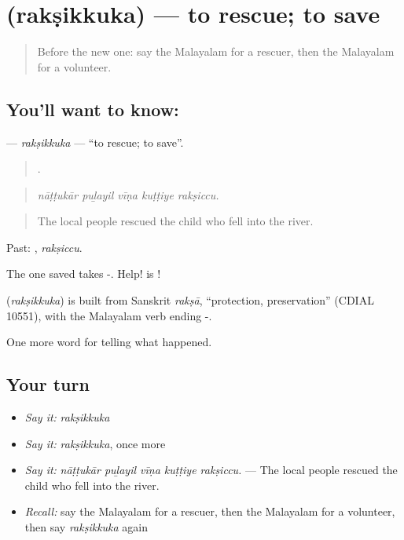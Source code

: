 \section[\texorpdfstring{\ml{രക്ഷിക്കുക} (rakṣikkuka)}{രക്ഷിക്കുക (rakṣikkuka)}]{ (rakṣikkuka) — to rescue; to save}

\label{lesson:ML-C375-raksikkuka}



\begin{quote}
Before the new one: say the Malayalam for a rescuer, then the Malayalam for a volunteer.
\end{quote}

\subsection*{You'll want to know: }
\textbf{} — \emph{rakṣikkuka} — \textquotedblleft{}to rescue; to save\textquotedblright{}.

\begin{quote}
    .
\end{quote}

\begin{quote}
\emph{nāṭṭukār puḻayil vīṇa kuṭṭiye rakṣiccu.}
\end{quote}

\begin{quote}
The local people rescued the child who fell into the river.
\end{quote}

Past: , \emph{rakṣiccu}.

The one saved takes -. Help! is !

\begin{cousinweb}
\textbf{} (\emph{rakṣikkuka}) is built from Sanskrit \emph{rakṣā}, \textquotedblleft{}protection, preservation\textquotedblright{} (CDIAL 10551), with the Malayalam verb ending -.
\end{cousinweb}

\begin{grammarlens}[title={What you've built}]
One more word for telling what happened.
\end{grammarlens}

\subsection*{Your turn}
\begin{itemize}
\raggedright
  \item \emph{Say it:} \emph{rakṣikkuka}
  \item \emph{Say it:} \emph{rakṣikkuka}, once more
  \item \emph{Say it:} \emph{nāṭṭukār puḻayil vīṇa kuṭṭiye rakṣiccu.} — The local people rescued the child who fell into the river.
  \item \emph{Recall:} say the Malayalam for a rescuer, then the Malayalam for a volunteer, then say \emph{rakṣikkuka} again
\end{itemize}

